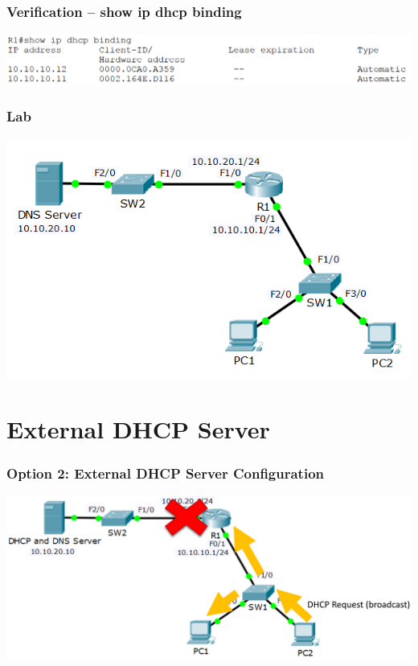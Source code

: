 \documentclass[pdflatex,compress,mathserif]{beamer}
\begin{document}
\begin{frame}
	\frametitle{Verification – show ip dhcp binding}
	\begin{center}
		\includegraphics[width=\linewidth]{img/img06}
	\end{center}
\end{frame}

\begin{frame}
	\frametitle{Lab}
	\begin{center}
		\includegraphics[width=\linewidth]{img/img07}
	\end{center}
\end{frame}

\section{External DHCP Server}

\begin{frame}
	\frametitle{Option 2: External DHCP Server Configuration}
	\begin{center}
		\includegraphics[width=\linewidth]{img/img08}
	\end{center}
\end{frame}
\end{document}
